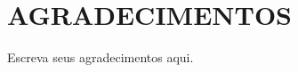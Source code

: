 \newpage
\thispagestyle{empty}
\section*{\centering AGRADECIMENTOS}
\vspace{0.5cm}
Escreva seus agradecimentos aqui.
\newpage
